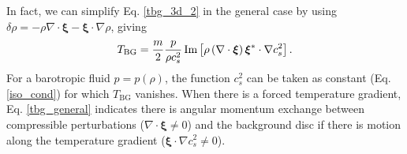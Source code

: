 In fact, we can simplify Eq. \ref{tbg_3d_2} in the general case by
using $\delta\rho = - \rho\nabla\cdot\bm{\xi} -
\bm{\xi}\cdot\nabla\rho$, giving
\begin{align}\label{tbg_general}
  T_\mathrm{BG} = \frac{m}{2}\frac{p}{\rho
    c_s^2}\operatorname{Im}\left[\rho\left(\nabla\cdot\bm{\xi}\right)\bm{\xi}^*\cdot\nabla
  c_s^2\right].  
\end{align} 
For a barotropic fluid $p=p(\rho)$, the function $c_s^2$ can be
taken as constant (Eq. \ref{iso_cond}) for which $T_\mathrm{BG}$
vanishes. When there is a forced temperature gradient,
Eq. \ref{tbg_general} indicates there is angular momentum exchange
between compressible perturbations ($\nabla\cdot\bm{\xi}\neq0$) and
the background disc if there is motion along the temperature
gradient ($\bm{\xi}\cdot\nabla c_s^2 \neq 0$).  





